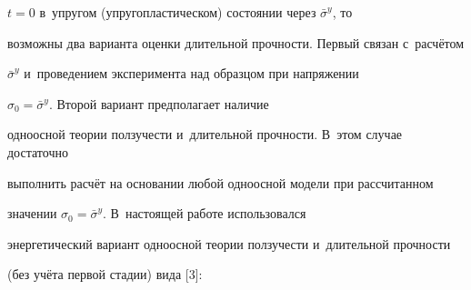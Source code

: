 $t=0$ в~упругом (упругопластическом) состоянии через $\bar {\sigma }^y$, то 

возможны два варианта оценки длительной прочности. Первый связан с~расчётом 

$\bar {\sigma }^y$ и~проведением эксперимента над образцом при напряжении 

$\sigma _0 = \bar {\sigma }^y$. Второй вариант предполагает наличие 

одноосной теории ползучести и~длительной прочности. В~этом случае достаточно 

выполнить расчёт на основании любой одноосной модели при рассчитанном 

значении $\sigma _0 = \bar {\sigma }^y$. В~настоящей работе использовался 

энергетический вариант одноосной теории ползучести и~длительной прочности 

(без учёта первой стадии) вида [3]:

